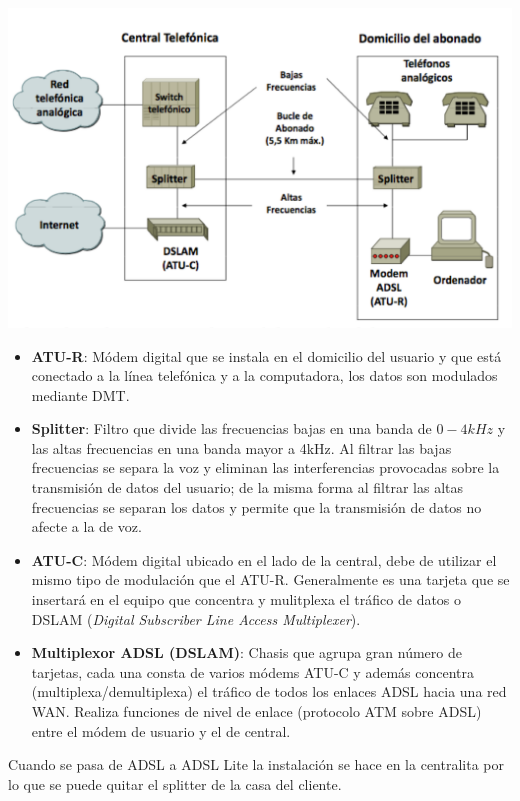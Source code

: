 \documentclass[10pt,portrait, twocolumn]{article}
\begin{document}
	\begin{center}
		\includegraphics[scale=0.3]{images/ADSL}
	\end{center}
	
	\begin{itemize}
		\item \textbf{ATU-R}: Módem digital que se instala en el domicilio del usuario y que está conectado a la línea telefónica y a la computadora, los datos son modulados mediante DMT.
		\item \textbf{Splitter}: Filtro que divide las frecuencias bajas en una banda de $0-4kHz$ y las altas frecuencias en una banda mayor a 4kHz. Al filtrar las bajas frecuencias se separa la voz y eliminan las interferencias provocadas sobre la transmisión de datos del usuario; de la misma forma al filtrar las altas frecuencias se separan los datos y permite que la transmisión de datos no afecte a la de voz.
		\item \textbf{ATU-C}: Módem digital ubicado en el lado de la central, debe de utilizar el mismo tipo de modulación que el ATU-R. Generalmente es una tarjeta que se insertará en el equipo que concentra y mulitplexa el tráfico de datos o DSLAM (\textit{Digital Subscriber Line Access Multiplexer}).
		\item \textbf{Multiplexor ADSL (DSLAM)}: Chasis que agrupa gran número de tarjetas, cada una consta de varios módems ATU-C y además concentra (multiplexa/demultiplexa) el tráfico de todos los enlaces ADSL hacia una red WAN. Realiza funciones de nivel de enlace (protocolo ATM sobre ADSL) entre el módem de usuario y el de central.
	\end{itemize}
	
Cuando se pasa de ADSL a ADSL Lite la instalación se hace en la centralita por lo que se puede quitar el splitter de la casa del cliente.
	
\end{document}
